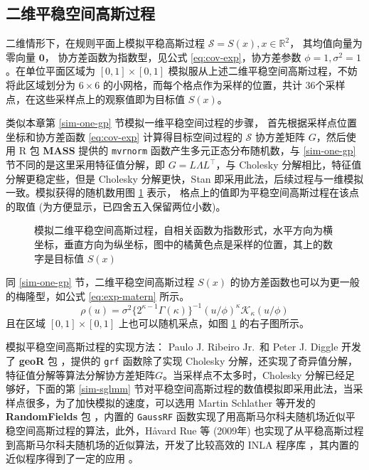 \documentclass[12pt,a4paper,UTF8,twoside]{book}
\theoremstyle{definition}
\theoremstyle{definition}
\theoremstyle{definition}
\theoremstyle{remark}
\begin{document}
\hypertarget{sim-two-gp}{%
\subsection{二维平稳空间高斯过程}\label{sim-two-gp}}

二维情形下，在规则平面上模拟平稳高斯过程
\(\mathcal{S} = S(x), x \in \mathbb{R}^2\)， 其均值向量为零向量
\(\mathbf{0}\)， 协方差函数为指数型，见公式 \eqref{eq:cov-exp}，协方差参数
\(\phi = 1, \sigma^2 = 1\)。在单位平面区域为 \([0,1] \times [0,1]\)
模拟服从上述二维平稳空间高斯过程，不妨将此区域划分为 \(6 \times 6\)
的小网格，而每个格点作为采样的位置，共计
36个采样点，在这些采样点上的观察值即为目标值 \(S(x)\)。

类似本章第 \ref{sim-one-gp} 节模拟一维平稳空间过程的步骤，
首先根据采样点位置坐标和协方差函数 \eqref{eq:cov-exp} 计算得目标空间过程的
\(\mathcal{S}\) 协方差矩阵 \(G\)，然后使用 R 包 \textbf{MASS} 提供的
\texttt{mvrnorm} 函数产生多元正态分布随机数，与 \ref{sim-one-gp}
节不同的是这里采用特征值分解，即 \(G = L\Lambda L^{\top}\)，与 Cholesky
分解相比，特征值分解更稳定些，但是 Cholesky 分解更快，Stan
即采用此法，后续过程与一维模拟一致。模拟获得的随机数用图
\ref{fig:sim-two-gp} 表示， 格点上的值即为平稳空间高斯过程在该点的取值
(为方便显示，已四舍五入保留两位小数)。

\begin{figure}

{\centering {}

}

\caption{模拟二维平稳空间高斯过程，自相关函数为指数形式，水平方向为横坐标，垂直方向为纵坐标，图中的橘黄色点是采样的位置，其上的数字是目标值 $S(x)$}\label{fig:sim-two-gp}
\end{figure}

同 \ref{sim-one-gp} 节，二维平稳空间高斯过程 \(S(x)\)
的协方差函数也可以为更一般的梅隆型，如公式 \eqref{eq:exp-matern} 所示。
\begin{equation}
\rho(u) = \sigma^2 \{ 2^{\kappa -1} \Gamma(\kappa) \}^{-1}( u/\phi )^{\kappa} \mathcal{K}_{\kappa}( u / \phi ) \label{eq:exp-matern}
\end{equation} \noindent 且在区域 \([0,1] \times [0,1]\)
上也可以随机采点，如图 \ref{fig:sim-two-gp} 的右子图所示。

模拟平稳空间高斯过程的实现方法： Paulo J. Ribeiro Jr.~和 Peter J. Diggle
开发了 \textbf{geoR} 包 \citep{geoR2001}，提供的 \texttt{grf}
函数除了实现 Cholesky
分解，还实现了奇异值分解，特征值分解等算法分解协方差矩阵\(G\)。当采样点不太多时，Cholesky
分解已经足够好，下面的第 \ref{sim-sglmm}
节对平稳空间高斯过程的数值模拟即采用此法，当采样点很多，为了加快模拟的速度，可以选用
Martin Schlather 等开发的 \textbf{RandomFields} 包
\citep{RandomFields2015}，内置的 \texttt{GaussRF}
函数实现了用高斯马尔科夫随机场近似平稳空间高斯过程的算法，此外，Håvard
Rue 等 (2009年) \citep{Rue2009}
也实现了从平稳高斯过程到高斯马尔科夫随机场的近似算法，开发了比较高效的
INLA 程序库 \citep{INLA2015}，其内置的近似程序得到了一定的应用
\citep{Blangiardo2015, Faraway2018}。
\end{document}
